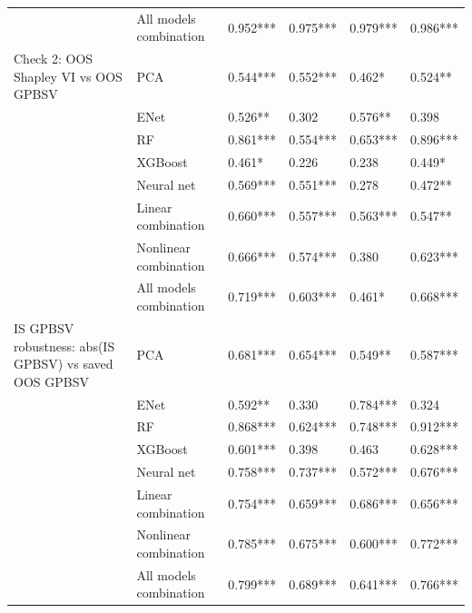 \begin{tabular}{llllll}
                                                         & All models combination &  0.952*** &  0.975*** &  0.979*** &  0.986*** \\
Check 2: OOS Shapley VI vs OOS GPBSV & PCA &  0.544*** &  0.552*** &    0.462* &   0.524** \\
                                                         & ENet &   0.526** &     0.302 &   0.576** &     0.398 \\
                                                         & RF &  0.861*** &  0.554*** &  0.653*** &  0.896*** \\
                                                         & XGBoost &    0.461* &     0.226 &     0.238 &    0.449* \\
                                                         & Neural net &  0.569*** &  0.551*** &     0.278 &   0.472** \\
                                                         & Linear combination &  0.660*** &  0.557*** &  0.563*** &   0.547** \\
                                                         & Nonlinear combination &  0.666*** &  0.574*** &     0.380 &  0.623*** \\
                                                         & All models combination &  0.719*** &  0.603*** &    0.461* &  0.668*** \\
IS GPBSV robustness: abs(IS GPBSV) vs saved OOS GPBSV & PCA &  0.681*** &  0.654*** &   0.549** &  0.587*** \\
                                                         & ENet &   0.592** &     0.330 &  0.784*** &     0.324 \\
                                                         & RF &  0.868*** &  0.624*** &  0.748*** &  0.912*** \\
                                                         & XGBoost &  0.601*** &     0.398 &     0.463 &  0.628*** \\
                                                         & Neural net &  0.758*** &  0.737*** &  0.572*** &  0.676*** \\
                                                         & Linear combination &  0.754*** &  0.659*** &  0.686*** &  0.656*** \\
                                                         & Nonlinear combination &  0.785*** &  0.675*** &  0.600*** &  0.772*** \\
                                                         & All models combination &  0.799*** &  0.689*** &  0.641*** &  0.766*** \\

\end{tabular}
